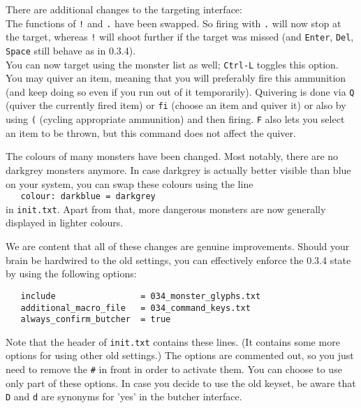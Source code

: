 \documentclass[a4paper,10pt]{article}
\newcommand{\key}[1]{{\texttt{#1}}} %
\newcommand{\para}{\vspace{1.5ex}}
\begin{document}
There are additional changes to the targeting interface: \\
The functions of \key{!} and \key{.} have been swapped. So firing with
\key{.} will now stop at the target, whereas \key{!} will shoot further
if the target was missed (and \key{Enter}, \key{Del}, \key{Space} still
behave as in 0.3.4). \\
You can now target using the monster list as well; \key{Ctrl-L} toggles
this option.\\
You may quiver an item, meaning that you will preferably fire this
ammunition (and keep doing so even if you run out of it temporarily). 
Quivering is done via \key{Q} (quiver the currently fired item) or 
\key{fi} (choose an item and quiver it) or also by using \key{(} (cycling 
appropriate ammunition) and then firing. \key{F} also lets you select an 
item to be thrown, but this command does not affect the quiver.

\newpage

The colours of many monsters have been changed. Most notably, there are
no darkgrey monsters anymore. In case darkgrey is actually better visible 
than blue on your system, you can swap these colours using the line \\
\verb#   colour: darkblue = darkgrey #\\
in \key{init.txt}. Apart from that, more dangerous monsters are now 
generally displayed in lighter colours.

\para

We are content that all of these changes are genuine improvements. Should
your brain be hardwired to the old settings, you can effectively enforce
the 0.3.4 state by using the following options:
\begin{verbatim}
   include                 = 034_monster_glyphs.txt
   additional_macro_file   = 034_command_keys.txt
   always_confirm_butcher  = true
\end{verbatim}

Note that the header of \key{init.txt} contains these lines. (It contains 
some more options for using other old settings.) The options are commented 
out, so you just need to remove the \key{\#} in front in order to activate 
them. You can choose to use only part of these options. In case you decide 
to use the old keyset, be aware that \key{D} and \key{d} are synonyms for 
'yes' in the butcher interface.
\end{document}
